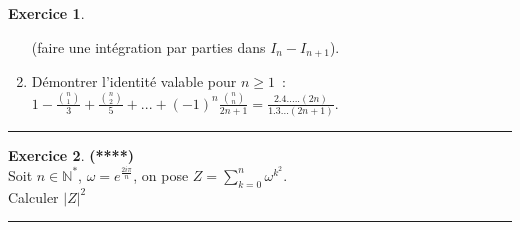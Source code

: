\documentclass[a4paper,11pt]{article}
\theoremstyle{definition}
\newtheorem{exo}{Exercice} %
\begin{document}
\begin{minipage}{1\linewidth}
\begin{minipage}[c]{0.48\linewidth}
\begin{exo}
\begin{enumerate}
		(faire une intégration par parties dans $I_n-I_{n+1}$).
		\item Démontrer l'identité valable pour
		$n\geq1$~:~$1-\frac{\binom{n}{1}}{3}+\frac{\binom{n}{2}}{5}+...+(-1)^n\frac{\binom{n}{n}}{2n+1}
		=\frac{2.4.....(2n)}{1.3...(2n+1)}$.
	\end{enumerate}
	
	\centering
	\rule{1\linewidth}{0.6pt}
\end{exo}

	\begin{exo}\textbf{(****)}\quad\\[0.2cm]%
	
	Soit $n \in \mathbb{N}^{*}$, $\omega = e^{\frac{2 i \pi}{n}}$, on pose $Z = \displaystyle\sum_{k=0}^{n}{\omega^{k^2}}$. \\
	Calculer $|Z|^{2}$
	
	\centering
	\rule{1\linewidth}{0.6pt}
\end{exo}

		
		
		
	\end{minipage}
\end{minipage}

	
\end{document}
